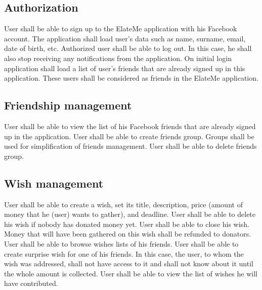 \subsection*{Authorization}
\begin{itemize}
User shall be able to sign up to the ElateMe application with his Facebook account. The application shall load user's data such as name, surname, email, date of birth, etc.
Authorized user shall be able to log out. In this case, he shall also stop receiving any notifications from the application.
On initial login application shall load a list of user's friends that are already signed up in this application. These users shall be considered as friends in the ElateMe application.
\end{itemize}

\subsection*{Friendship management}

\begin{itemize}
User shall be able to view the list of his Facebook friends that are already signed up in the application.
User shall be able to create friends group. Groups shall be used for simplification of friends management.
User shall be able to delete friends group.
\end{itemize}

\subsection*{Wish management}

\begin{itemize}
User shall be able to create a wish, set its title, description, price (amount of money that he (user) wants to gather), and deadline.
User shall be able to delete his wish if nobody has donated money yet.
User shall be able to close his wish. Money that will have been gathered on this wish shall be refunded to donators.
User shall be able to browse wishes lists of his friends.
User shall be able to create surprise wish for one of his friends. In this case, the user, to whom the wish was addressed, shall not have access to it and shall not know about it until the whole amount is collected.
User shall be able to view the list of wishes he will have contributed.
\end{itemize}

